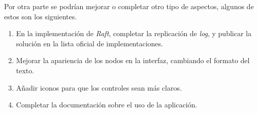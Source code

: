 Por otra parte se podrían mejorar o completar otro tipo de aspectos, algunos de estos son los siguientes.

\begin{enumerate}
\item En la implementación de \textit{Raft}, completar la replicación de \textit{log}, y publicar la solución en la lista oficial de implementaciones\cite{raft1}.

\item Mejorar la apariencia de los nodos en la interfaz, cambiando el formato del texto.

\item Añadir iconos para que los controles sean más claros.

\item Completar la documentación sobre el uso de la aplicación.
\end{enumerate}
